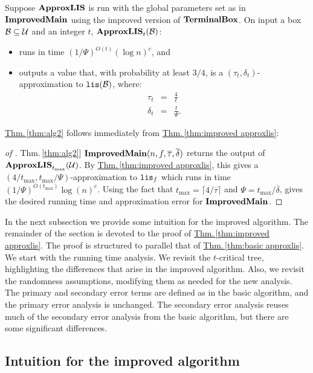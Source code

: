 \documentclass{acmsmall}
\newcommand{\cB}{{\cal B}}
\newcommand{\cU}{{\cal U}}
\newcommand{\Thm}[1]{\hyperref[thm:#1]{Thm.\,\ref*{thm:#1}}} %
\newcommand{\lis}{{\tt lis}}
\newcommand{\terminalbox}{{\rm{\bf TerminalBox}}}
\newcommand{\deltapar}{\overline{\delta}}
\newcommand{\taupar}{\overline{\tau}}
\newcommand{\errorcont}{\Psi}
\newcommand{\improvedmain}{{\rm {\bf ImprovedMain}}}
\newcommand{\approxlis}{{\rm {\bf ApproxLIS}}}
\begin{document}
\begin{theorem}
\label{thm:improved approxlis}  
Suppose $\approxlis$ is run with the global parameters set as in $\improvedmain$ using
the improved version of $\terminalbox$.
On input a box $\cB \subseteq \cU$ and an integer $t$, $\approxlis_t(\cB)$:
\begin{itemize}
\item  runs in time $(1/\errorcont)^{O(t)}(\log n)^c$, and
\item outputs a value that, with probability at least $3/4$, is a
{\em $(\tau_t,\delta_t )$}-approximation to $\lis(\cB)$, where:
\begin{eqnarray*}
\tau_t&=& \frac{4}{t} \\
\delta_t& = & \frac{t}{\errorcont}.
\end{eqnarray*} 
\end{itemize}
\end{theorem}

\Thm{alg2} follows immediately from \Thm{improved approxlis}:

\begin{proof}[of \Thm{alg2}]
$\improvedmain(n,f,\taupar,\deltapar)$ 
returns the output of $\approxlis_{t_{\max}}(\cU)$.  By \Thm{improved approxlis}, this gives a
$(4/t_{\max},t_{\max}/\errorcont)$-approximation to $\lis_f$ which runs in time $(1/\errorcont)^{O(t_{\max})}\log(n)^c$.  Using the fact that $t_{\max} = \lceil 4/\taupar \rceil$ and $\errorcont=t_{\max}/\deltapar$,
gives the desired running time and approximation error for $\improvedmain$.
\end{proof}

In the next subsection we provide some intuition for the improved algorithm.  The remainder of the section
is devoted to the proof of \Thm{improved approxlis}.  The proof is structured to parallel
that of \Thm{basic approxlis}.   We start with the running time analysis.  We revisit the $t$-critical tree,
highlighting the differences that arise in the improved algorithm.  Also, we revisit the randomness assumptions, modifying them as needed for the new analysis.  The primary and secondary error terms are defined
as in the basic algorithm, and the primary error analysis is unchanged.  The secondary error analysis reuses
much of the secondary error analysis from the basic algorithm,  but there are some significant
differences.

\subsection{Intuition for the improved algorithm}
\end{document}

